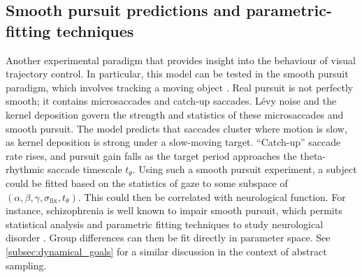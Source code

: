 \subsection{Smooth pursuit predictions and parametric-fitting techniques}\label{subsec:smooth_pursuit_and_predictions}

Another experimental paradigm that provides insight into the behaviour of visual trajectory control. In particular, this model can be tested in the smooth pursuit paradigm, which involves tracking a moving object \cite{erkelens_coordination_2006, yan_metrics_2025}. Real pursuit is not perfectly smooth; it contains microsaccades and catch-up saccades. Lévy noise and the kernel deposition govern the strength and statistics of these microsaccades and smooth pursuit. The model predicts that saccades cluster where motion is slow, as kernel deposition is strong under a slow-moving target. ``Catch-up'' saccade rate rises, and pursuit gain falls as the target period approaches the theta-rhythmic saccade timescale $t_\theta$. Using such a smooth pursuit experiment, a subject could be fitted based on the statistics of gaze to some subspace of $(\alpha,\beta,\gamma, \sigma_{\text{fix}}, t_\theta)$. This could then be correlated with neurological function. For instance, schizophrenia is well known to impair smooth pursuit, which permits statistical analysis and parametric fitting techniques to study neurological disorder \cite{caldani_saccadic_2017, law_eye-tracking_1973, morita_eye_2017, zhu_diagnosis_2024}. Group differences can then be fit directly in parameter space. See \cref{subsec:dynamical_goals} for a similar discussion in the context of abstract sampling.